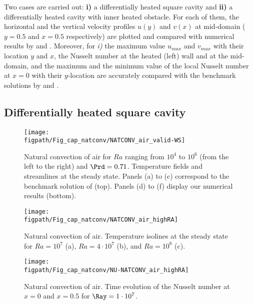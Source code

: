 Two cases are carried out: \textbf{ i)} a differentially heated square cavity and \textbf{ ii)} a differentially heated cavity with inner heated obstacle.
For each of them, the horizontal and the vertical velocity profiles $u(y)$ and $v(x)$ at mid-domain ($y=0.5$ and $x=0.5$ respectively) are plotted and compared with numerical results by \cite{LeQuere91} and \cite{Raluca2013}. 
Moreover, for \textit{ i)} the maximum value $u_{max}$ and $v_{max}$ with their location $y$ and $x$, the Nusselt number at the heated (left) wall and  at the mid-domain, and the maximum and the minimum value of the local Nusselt number at $x=0$ with their $y$-location are accurately compared with the benchmark solutions by \cite{de1983natural} and \cite{LeQuere91}.

\subsection{Differentially heated square cavity} \label{sub-diff-heated}

\begin{figure}
	\begin{center}
		\texttt{[image: \\figpath/Fig\_cap\_natconv/NATCONV\_air\_valid-WS]} 
	\end{center}
	\caption{Natural convection of air for $Ra$ ranging from $10^4$ to $10^6$ (from the left to the right) and $\Prd = 0.71$. Temperature fields and streamlines at the steady state. Panels (a) to (c) correspond to the benchmark solution of \cite{Wakashima-2004} (top). Panels (d) to (f) display our numerical results (bottom).}
	\label{fig-natconv-field}
\end{figure}

\begin{figure}
	\begin{center}
		\texttt{[image: \\figpath/Fig\_cap\_natconv/NATCONV\_air\_highRA]} 
	\end{center}
	\caption{Natural convection of air. Temperature isolines at the steady state for $Ra = 10^7$ (a), $Ra = 4 \cdot 10^7$ (b), and  $Ra = 10^8$ (c).}
	\label{fig-natconv-T-highRa}
\end{figure}

\begin{figure}
	\begin{center}
		\texttt{[image: \\figpath/Fig\_cap\_natconv/NU-NATCONV\_air\_highRA]} 
	\end{center}
	\caption{Natural convection of air. Time evolution of the Nusselt number at $x=0$ and $x=0.5$ for $\Ray = 1 \cdot 10^7$.}
	\label{fig-natconv-NU-highRa}
\end{figure}


